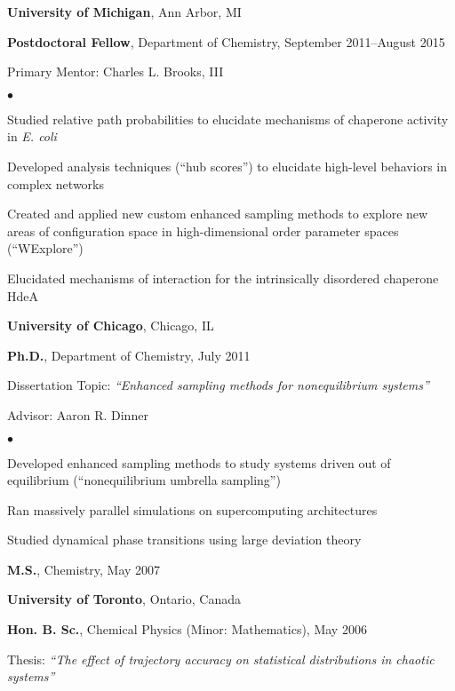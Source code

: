 \documentclass[margin,line]{res}
\newenvironment{list1}{
  \begin{list}{\ding{113}}{%
      \setlength{\itemsep}{0.05in}
      \setlength{\parsep}{0in} \setlength{\parskip}{0in}
      \setlength{\topsep}{0in} \setlength{\partopsep}{0in} 
      \setlength{\leftmargin}{0.17in}}}{\end{list}}
\newenvironment{list2}{
  \begin{list}{$\bullet$}{%
      \setlength{\itemsep}{0.03in}
      \setlength{\parsep}{0in} \setlength{\parskip}{0in}
      \setlength{\topsep}{0.05in} \setlength{\partopsep}{0in} 
      \setlength{\leftmargin}{0.2in}}}{\end{list}}
\begin{document}
\begin{resume}
{\bf University of Michigan}, Ann Arbor, MI\\
\vspace {-0.05in}
\begin{list1}
\item[] {\bf Postdoctoral Fellow}, Department of Chemistry, September 2011--August 2015
\item[] Primary Mentor:  Charles L. Brooks, III
\begin{list2}
\item {Studied relative path probabilities to elucidate mechanisms of chaperone activity in \textit{E. coli}}
\item {Developed analysis techniques (``hub scores'') to elucidate high-level behaviors in complex networks}
\item {Created and applied new custom enhanced sampling methods to explore new areas of configuration space in high-dimensional order parameter spaces (``WExplore'')}
\item {Elucidated mechanisms of interaction for the intrinsically disordered chaperone HdeA}
\end{list2}
\end{list1}

{\bf University of Chicago}, Chicago, IL\\
\vspace {-0.05in}
\begin{list1}
\item[] {{\bf Ph.D.}, Department of Chemistry, July 2011}
\item[] {Dissertation Topic:  \textit{``Enhanced sampling methods for nonequilibrium systems''}}
\item[] {Advisor:  Aaron R. Dinner}
\begin{list2}
\item {Developed enhanced sampling methods to study systems driven out of equilibrium (``nonequilibrium umbrella sampling'')}
\item {Ran massively parallel simulations on supercomputing architectures}
\item {Studied dynamical phase transitions using large deviation theory}
\end{list2}
\item[] {{\bf M.S.}, Chemistry,  May 2007}
\end{list1}

{\bf University of Toronto}, Ontario, Canada\\
\vspace {-0.05in}
\begin{list1}
\item[] {\bf Hon. B. Sc.}, Chemical Physics (Minor: Mathematics),  May 2006
\item[] {Thesis:  \textit{``The effect of trajectory accuracy on statistical distributions in chaotic systems''}}
\end{list1}


\end{resume}
\end{document}

